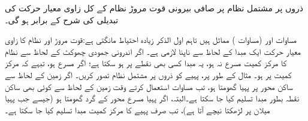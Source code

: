  ذروں پر مشتمل نظام  پر صافی بیرونی قوت مروڑ     نظام کے کل زاوی معیار حرکت  کی تبدیلی کی شرح کے برابر ہو گی۔
 
 مساوات  اور   (مساوات )   مماثل ہیں  تاہم  اول الذکر  زیادہ احتیاط مانگتی  ہے:قوت مروڑ اور نظام کا زاوی معیار حرکت ایک  مبدا کے لحاظ سے   ناپنا لازمی ہے۔ اگر  اندرونی جمودی چھوکٹ  کے لحاظ سے نظام کا مرکز کمیت  مسرع نہ ہو، یہ مبدا کسی بھی نقطے پر ہو سکتا ہے؛ اگر مسرع ہو، تبہے کہ   مرکز کمیت پر  ہو۔ مثال کے طور پر،  پہیے کو ذروں پر مشتمل نظام تصور کریں۔ اگر زمین کے لحاظ سے ساکن  محور پر پہیا   گھومتا ہو، تب مساوات   استعمال  کرتے وقت زمین کے لحاظ سے کوئی بھی ساکن نقطہ بطور مبدا تسلیم کیا جا سکتا ہے۔البتہ، اگر پہیا مسرع محور کے گرد گھومتا ہو (جیسے جب پہیا میلان پر لڑھکتا نیچے آتا ہے)،  تب صرف پہیے کا مرکز کمیت مبدا  تسلیم کیا جا سکتا ہے۔
 
 

